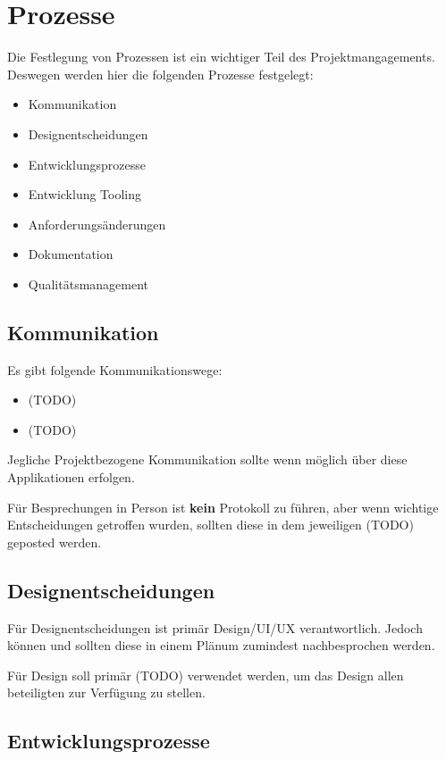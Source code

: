 \section{Prozesse}
\label{prozesse}

Die Festlegung von Prozessen ist ein wichtiger Teil des Projektmangagements. Deswegen werden hier die folgenden Prozesse festgelegt:

\begin{itemize}
	\item Kommunikation
	\item Designentscheidungen
	\item Entwicklungsprozesse
	\item Entwicklung Tooling
	\item Anforderungsänderungen
	\item Dokumentation
	\item Qualitätsmanagement
\end{itemize}

\subsection{Kommunikation}

Es gibt folgende Kommunikationswege:
\begin{itemize}
	\item {\color{red}(TODO)}
	\item {\color{red}(TODO)}
\end{itemize}

Jegliche Projektbezogene Kommunikation sollte wenn möglich über diese Applikationen erfolgen. 

Für Besprechungen in Person ist \textbf{kein} Protokoll zu führen, aber wenn wichtige Entscheidungen getroffen wurden, sollten diese in dem jeweiligen {\color{red}(TODO)} geposted werden.

\subsection{Designentscheidungen}

Für Designentscheidungen ist primär Design/UI/UX verantwortlich. Jedoch können und sollten diese in einem Plänum zumindest nachbesprochen werden.

Für Design soll primär {\color{red}(TODO)} verwendet werden, um das Design allen beteiligten zur Verfügung zu stellen.

\subsection{Entwicklungsprozesse}

